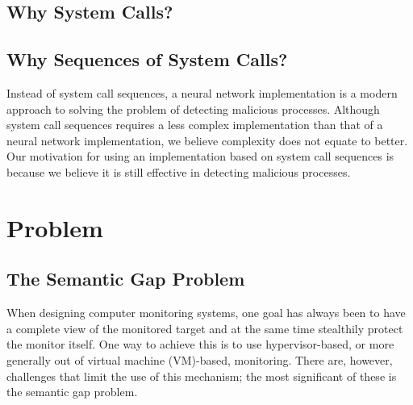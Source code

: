 \documentclass{report}
\begin{document}
\begin{spacing}{1.5}
\subsection{Why System Calls?}













\subsection{Why Sequences of System Calls?}

Instead of system call sequences, a neural network implementation is a modern
approach to solving the problem of detecting malicious processes. Although system
call sequences requires a less complex implementation than that of a neural network
implementation, we believe complexity does not equate to better. Our motivation for
using an implementation based on system call sequences is because we believe it is
still effective in detecting malicious processes.

















\section{Problem}
\subsection{The Semantic Gap Problem}
When designing computer monitoring systems, one goal has always been to have a complete view of the
monitored target and at the same time stealthily protect the monitor itself. One way to achieve this is to
use hypervisor-based, or more generally out of virtual machine (VM)-based, monitoring. There are, however,
challenges that limit the use of this mechanism; the most significant of these is the semantic gap problem.




\end{spacing}
\end{document}
